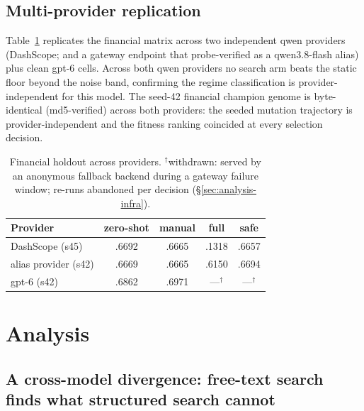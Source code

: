 \documentclass[11pt]{article}
\newcommand{\zs}{zero-shot}
\begin{document}
\subsection{Multi-provider replication}
\label{sec:results-multi}

Table~\ref{tab:multi} replicates the financial matrix across two independent qwen providers (DashScope; and a gateway endpoint that probe-verified as a qwen3.8-flash alias) plus clean gpt-6 cells. Across both qwen providers no search arm beats the static floor beyond the noise band, confirming the regime classification is provider-independent for this model. The seed-42 financial champion genome is byte-identical (md5-verified) across both providers: the seeded mutation trajectory is provider-independent and the fitness ranking coincided at every selection decision.

\begin{table}[t]
\centering\small
\begin{tabular}{lcccc}
\toprule
Provider & \zs{} & manual & full & safe \\
\midrule
DashScope (s45) & .6692 & .6665 & .1318 & .6657 \\
alias provider (s42) & .6669 & .6665 & .6150 & .6694 \\
gpt-6 (s42) & .6862 & .6971 & ---$^{\dagger}$ & ---$^{\dagger}$ \\
\bottomrule
\end{tabular}
\caption{Financial holdout across providers. $^{\dagger}$withdrawn: served by an anonymous fallback backend during a gateway failure window; re-runs abandoned per decision (\S\ref{sec:analysis-infra}).}
\label{tab:multi}
\end{table}

\section{Analysis}
\label{sec:analysis}

\subsection{A cross-model divergence: free-text search finds what structured search cannot}
\label{sec:analysis-divergence}
\end{document}

